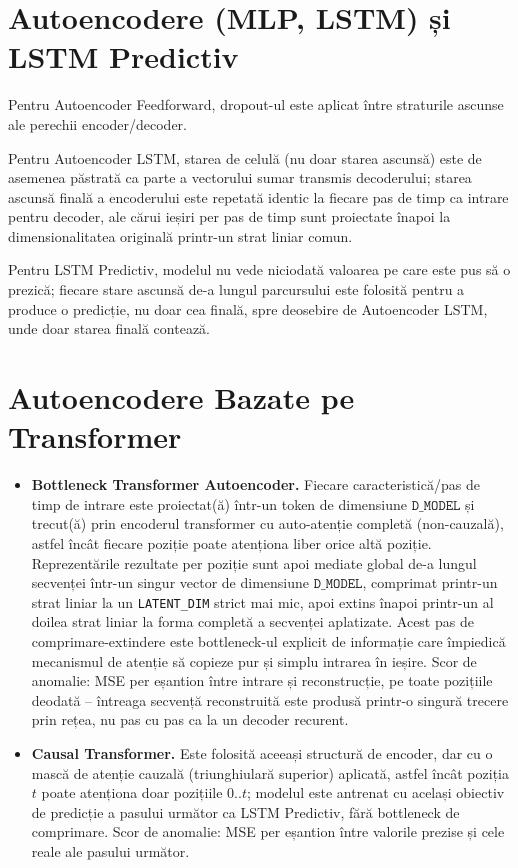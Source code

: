 \section{Autoencodere (MLP, LSTM) și LSTM Predictiv}

Pentru Autoencoder Feedforward, dropout-ul este aplicat între straturile ascunse ale perechii encoder/decoder.

Pentru Autoencoder LSTM, starea de celulă (nu doar starea ascunsă) este de asemenea păstrată ca parte a vectorului sumar transmis decoderului; starea ascunsă finală a encoderului este repetată identic la fiecare pas de timp ca intrare pentru decoder, ale cărui ieșiri per pas de timp sunt proiectate înapoi la dimensionalitatea originală printr-un strat liniar comun.

Pentru LSTM Predictiv, modelul nu vede niciodată valoarea pe care este pus să o prezică; fiecare stare ascunsă de-a lungul parcursului este folosită pentru a produce o predicție, nu doar cea finală, spre deosebire de Autoencoder LSTM, unde doar starea finală contează.

\section{Autoencodere Bazate pe Transformer}

\begin{itemize}
  \item \textbf{Bottleneck Transformer Autoencoder.} Fiecare caracteristică/pas de timp de intrare este proiectat(ă) într-un token de dimensiune $\texttt{D\_MODEL}$ și trecut(ă) prin encoderul transformer cu auto-atenție completă (non-cauzală), astfel încât fiecare poziție poate atenționa liber orice altă poziție. Reprezentările rezultate per poziție sunt apoi mediate global de-a lungul secvenței într-un singur vector de dimensiune $\texttt{D\_MODEL}$, comprimat printr-un strat liniar la un \texttt{LATENT\_DIM} strict mai mic, apoi extins înapoi printr-un al doilea strat liniar la forma completă a secvenței aplatizate. Acest pas de comprimare-extindere este bottleneck-ul explicit de informație care împiedică mecanismul de atenție să copieze pur și simplu intrarea în ieșire. Scor de anomalie: MSE per eșantion între intrare și reconstrucție, pe toate pozițiile deodată -- întreaga secvență reconstruită este produsă printr-o singură trecere prin rețea, nu pas cu pas ca la un decoder recurent.
  \item \textbf{Causal Transformer.} Este folosită aceeași structură de encoder, dar cu o mască de atenție cauzală (triunghiulară superior) aplicată, astfel încât poziția $t$ poate atenționa doar pozițiile $0..t$; modelul este antrenat cu același obiectiv de predicție a pasului următor ca LSTM Predictiv, fără bottleneck de comprimare. Scor de anomalie: MSE per eșantion între valorile prezise și cele reale ale pasului următor.
\end{itemize}

